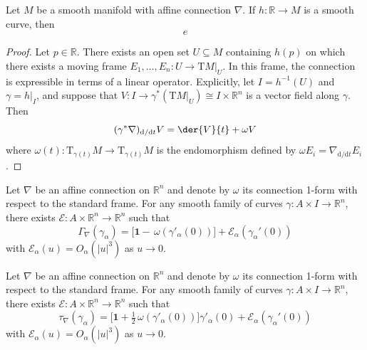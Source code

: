 \begin{lemma}
  Let $M$ be a smooth manifold with affine connection $\nabla$. If $h \colon \mathbb{R} \to M$ is a smooth curve, then
  \begin{equation}
    e
  \end{equation}
\end{lemma}
\begin{proof}
Let $p \in \mathbb{R}$. There exists an open set $U \subseteq M$  containing $h(p)$ on which there exists a moving frame $E_1, \ldots, E_n \colon U \to \mathrm{T}M|_U$. In this frame, the connection is expressible in terms of a linear operator. Explicitly, let $I = h^{-1}(U)$ and $\gamma = h|_I$, and suppose that $V \colon I \to \gamma^*(\mathrm{T}M|_U) \cong I \times \mathbb{R}^n$ is a vector field along $\gamma$. Then
\begin{equation}
(\gamma^* \nabla)_{\mathrm{d}/\mathrm{d}t} V = \der{V}{t} + \omega V
\end{equation}
where $\omega(t) \colon \mathrm{T}_{\gamma(t)}M \to \mathrm{T}_{\gamma(t)}M $ is the endomorphism defined by $\omega E_i = \nabla_{\mathrm{d}/\mathrm{d}t} E_i$. 

\end{proof}

\newpage

\begin{lemma}
  Let $\nabla$ be an affine connection on $\mathbb{R}^n$ and denote by $\omega$ its connection 1-form with respect to the standard frame. For any smooth family of curves $\gamma \colon A \times I \to \mathbb{R}^n$, there exists $\mathcal{E} \colon A \times \mathbb{R}^n \to \mathbb{R}^n$ such that
  \begin{equation}
    \Gamma_\nabla (\gamma_\alpha) = \Big[\mathbf{1} - \, \omega (\gamma'_\alpha(0))\Big] + \mathcal{E}_\alpha(\gamma_\alpha'(0))
  \end{equation}
  with $\mathcal{E}_\alpha(u) = O_\alpha(|u|^3)$ as $u \to 0$. 
\end{lemma}


\begin{lemma}
  Let $\nabla$ be an affine connection on $\mathbb{R}^n$ and denote by $\omega$ its connection 1-form with respect to the standard frame. For any smooth family of curves $\gamma \colon A \times I \to \mathbb{R}^n$, there exists $\mathcal{E} \colon A \times \mathbb{R}^n \to \mathbb{R}^n$ such that
  \begin{equation}
    \tau_\nabla (\gamma_\alpha) = \Big[\mathbf{1} + \tfrac{1}{2} \, \omega (\gamma'_\alpha(0))\Big]  \gamma'_\alpha(0) + \mathcal{E}_\alpha(\gamma_\alpha'(0))
  \end{equation}
  with $\mathcal{E}_\alpha(u) = O_\alpha(|u|^3)$ as $u \to 0$. 
\end{lemma}

